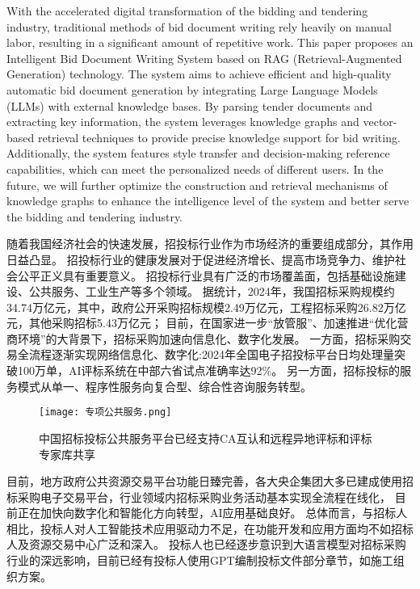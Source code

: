 \documentclass{xmu}
\begin{document}
\begin{enabstract}
With the accelerated digital transformation of the bidding and tendering industry, 
traditional methods of bid document writing rely heavily on manual labor, 
resulting in a significant amount of repetitive work. 
This paper proposes an Intelligent Bid Document Writing System 
based on RAG (Retrieval-Augmented Generation) technology. 
The system aims to achieve efficient and high-quality automatic bid document generation 
by integrating Large Language Models (LLMs) with external knowledge bases. 
By parsing tender documents and extracting key information, 
the system leverages knowledge graphs and vector-based retrieval techniques 
to provide precise knowledge support for bid writing. Additionally, 
the system features style transfer and decision-making reference capabilities, 
which can meet the personalized needs of different users. In the future, 
we will further optimize the construction and retrieval mechanisms of knowledge graphs 
to enhance the intelligence level of the system 
and better serve the bidding and tendering industry.
\end{enabstract}

\tableofcontents

随着我国经济社会的快速发展，招投标行业作为市场经济的重要组成部分，其作用日益凸显。
招投标行业的健康发展对于促进经济增长、提高市场竞争力、维护社会公平正义具有重要意义。
招投标行业具有广泛的市场覆盖面，包括基础设施建设、公共服务、工业生产等多个领域。
据统计，2024年，我国招标采购规模约34.74万亿元，其中，政府公开采购招标规模2.49万亿元，工程招标采购26.82万亿元，其他采购招标5.43万亿元；\cite{chyxx}
目前，在国家进一步“放管服”、加速推进“优化营商环境”的大背景下，招标采购加速向信息化、数字化发展。\cite{zhaotoubiaoxianzhuang}
一方面，招标采购交易全流程逐渐实现网络信息化、数字化:2024年全国电子招投标平台日均处理量突破100万单，AI评标系统在中部六省试点准确率达92\%\cite{report}。
另一方面，招标投标的服务模式从单一、程序性服务向复合型、综合性咨询服务转型。

\begin{figure}[!htb]
    \centering
    \texttt{[image: 专项公共服务.png]}\\
    \caption{中国招标投标公共服务平台已经支持CA互认和远程异地评标和评标专家库共享}\label{zhuanjia}
\end{figure}
目前，地方政府公共资源交易平台功能日臻完善，各大央企集团大多已建成使用招标采购电子交易平台，行业领域内招标采购业务活动基本实现全流程在线化，
目前正在加快向数字化和智能化方向转型，AI应用基础良好。
总体而言，与招标人相比，投标人对人工智能技术应用驱动力不足，在功能开发和应用方面均不如招标人及资源交易中心广泛和深入。
投标人也已经逐步意识到大语言模型对招标采购行业的深远影响，目前已经有投标人使用GPT编制投标文件部分章节，如施工组织方案。\cite{AIzhanwang}
\end{document}
